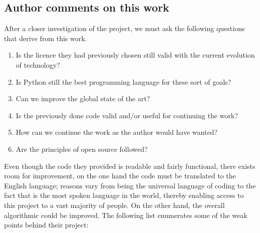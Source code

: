 \subsection{Author comments on this work}
After a closer investigation of the project, we must ask the following questions that derive from this work.
\begin{enumerate}
    \item Is the licence they had previously chosen still valid with the current evolution of technology?
    \item Is Python still the best programming language for these sort of goals?
    \item Can we improve the global state of the art?
    \item Is the previously done code valid and/or useful for continuing the work?
    \item How can we continue the work as the author would have wanted?
    \item Are the principles of open source followed?
\end{enumerate}

Even though the code they provided is readable and fairly functional, there exists room for improvement, on the one hand the code must be translated to the English language; reasons vary from being the universal language of coding to the fact that is the most spoken language in the world, thereby enabling access to this project to a vast majority of people. On the other hand, the overall algorithmic could be improved. The following list enumerates some of the weak points behind their project:

